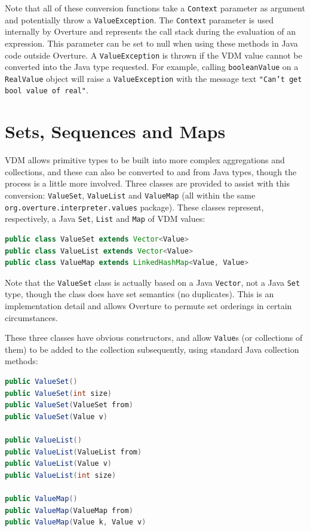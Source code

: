 \documentclass{overturerepchap}
\newcommand{\url}[1]{\texttt{#1}}
\begin{document}
Note that all of these conversion functions take a \texttt{Context} parameter as argument and potentially throw a \texttt{ValueException}. The \texttt{Context} parameter is used internally by Overture and represents the call stack during the evaluation of an expression. This parameter can be set to null when using these methods in Java code outside Overture. A \texttt{ValueException} is thrown if the VDM value cannot be converted into the Java type requested. For example, calling \texttt{booleanValue} on a \texttt{RealValue} object will raise a \texttt{ValueException} with the message text \texttt{"Can't get bool value of real"}.

\section{Sets, Sequences and Maps}

VDM allows primitive types to be built into more complex aggregations and collections, and these can also be converted to and from Java types, though the process is a little more involved. Three classes are provided to assist with this conversion: \texttt{ValueSet}, \texttt{ValueList} and \texttt{ValueMap} (all within the same  \url{org.overture.interpreter.values} package). These classes represent, respectively, a Java \texttt{Set}, \texttt{List} and \texttt{Map} of VDM values:

\begin{lstlisting}[language=JAVA]
public class ValueSet extends Vector<Value>
public class ValueList extends Vector<Value>
public class ValueMap extends LinkedHashMap<Value, Value>
\end{lstlisting}

Note that the \texttt{ValueSet} class is actually based on a Java \texttt{Vector}, not a Java \texttt{Set} type, though the class does have set semantics (no duplicates). This is an implementation detail and allows Overture to permute set orderings in certain circumstances.

These three classes have obvious constructors, and allow \texttt{Value}s (or collections of them) to be added to the collection subsequently, using standard Java collection methods:

\begin{lstlisting}[language=JAVA]
public ValueSet()
public ValueSet(int size)
public ValueSet(ValueSet from)
public ValueSet(Value v)

public ValueList()
public ValueList(ValueList from)
public ValueList(Value v)
public ValueList(int size)

public ValueMap()
public ValueMap(ValueMap from)
public ValueMap(Value k, Value v)
\end{lstlisting}
\end{document}
